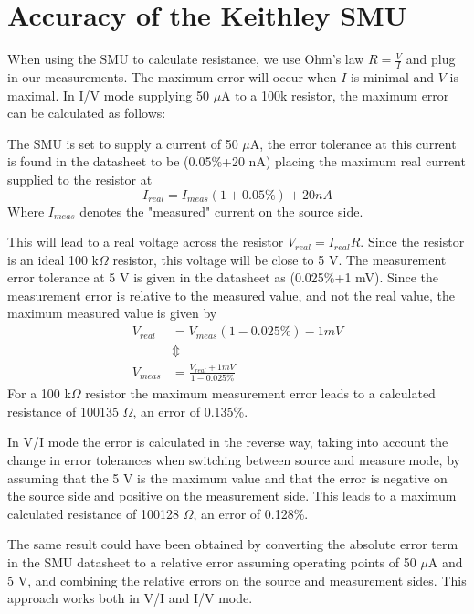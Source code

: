 \section{Accuracy of the Keithley SMU}
When using the SMU to calculate resistance, we use Ohm's law \(R = \frac{V}{I}\) and plug in our measurements.
The maximum error will occur when \(I\) is minimal and \(V\) is maximal. In I/V mode supplying 50 \(\mu\)A to
a 100k resistor, the maximum error can be calculated as follows:

The SMU is set to supply a current of 50 \(\mu\)A, the error tolerance at this current is found in the datasheet
to be (0.05\%+20 nA) placing the maximum real current supplied to the resistor at
\begin{equation*}
    I_{real}=I_{meas}(1+0.05\%)+20 nA
\end{equation*}
Where \(I_{meas}\) denotes the "measured" current on the source side.

This will lead to a real voltage across the resistor \(V_{real}=I_{real}R\). Since the resistor is an ideal 100 k\(\Omega\)
resistor, this voltage will be close to 5 V. The measurement error tolerance at 5 V is given in the datasheet as
(0.025\%+1 mV). Since the measurement error is relative to the measured value, and not the real value, the maximum
measured value is given by
\begin{align*}
    V_{real} &= V_{meas}(1-0.025\%)-1mV \\
    &\Updownarrow \\
    V_{meas} &= \frac{V_{real}+1mV}{1-0.025\%}
\end{align*}
For a 100 k\(\Omega\) resistor the maximum measurement error leads to a calculated resistance of 100135 \(\Omega\), an error
of 0.135\%.

In V/I mode the error is calculated in the reverse way, taking into account the change in error tolerances when switching
between source and measure mode, by assuming that the 5 V is the maximum value and that the error is negative on
the source side and positive on the measurement side. This leads to a maximum calculated resistance of 100128 \(\Omega\), an error of 0.128\%.

The same result could have been obtained by converting the absolute error term in the SMU datasheet to a relative error
assuming operating points of 50 \(\mu\)A and 5 V, and combining the relative errors on the source and measurement sides.
This approach works both in V/I and I/V mode.

